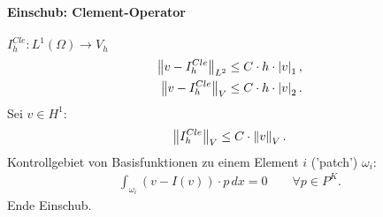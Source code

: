 \paragraph{Einschub: Clement-Operator}
\label{sec:einsch-clem-oper}

$I_{h}^{Cle}: L^{1}(\Omega) \to V_{h}$
\begin{align*}
  \left \|v - I_{h}^{Cle} \right\|_{L^{2}} \leq C\cdot h\cdot \left|v\right|_{1}, \\
  \left \|v - I_{h}^{Cle} \right\|_{V} \leq C\cdot h\cdot \left|v\right|_{2}. 
\end{align*}
Sei $v \in H^{1}$:
\begin{align*}
  \left \|I_{h}^{Cle} \right\|_{V} \leq C\cdot \left \|v \right\|_{V}. 
\end{align*}
Kontrollgebiet von Basisfunktionen zu einem Element $i$ ('patch') $\omega_{i}$:
\begin{align*}
  \int_{\omega_{i}}(v - I(v))\cdot p \, dx = 0 \qquad \forall p \in P^{K}. 
\end{align*}
Ende Einschub. 

